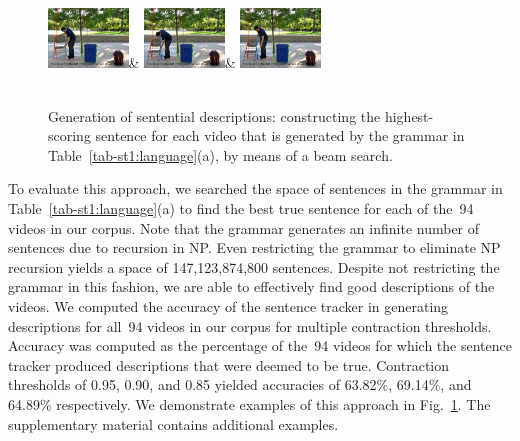 \begin{figure}
\begin{tabular}
    \includegraphics[width=0.19\textwidth]{images/generation1-0006}&
    \includegraphics[width=0.19\textwidth]{images/generation1-0008}&
    \includegraphics[width=0.19\textwidth]{images/generation1-0010}\\
    \\
  \end{tabular}
  \caption{Generation of sentential descriptions: constructing the
    highest-scoring sentence for each video that is generated by the grammar in
    Table~\protect\ref{tab-st1:language}(a), by means of a beam search.}
  \label{fig-st1:generation}
\end{figure}

To evaluate this approach, we searched the space of sentences in the grammar in
Table~\ref{tab-st1:language}(a) to find the best true sentence for each of the~94
videos in our corpus.
%
Note that the grammar generates an infinite number of sentences due to
recursion in NP.\@
%
Even restricting the grammar to eliminate NP recursion yields a space of
147,123,874,800 sentences.
%
Despite not restricting the grammar in this fashion, we are able to effectively
find good descriptions of the videos.
%
We computed the accuracy of the sentence tracker in generating descriptions for
all~94 videos in our corpus for multiple contraction thresholds.
%
Accuracy was computed as the percentage of the~94 videos for which the
sentence tracker produced descriptions that were deemed to be true.
%
Contraction thresholds of 0.95, 0.90, and 0.85 yielded accuracies of
63.82\%, 69.14\%, and 64.89\% respectively.
%
We demonstrate examples of this approach in Fig.~\ref{fig-st1:generation}.
%
The supplementary material contains additional examples.

